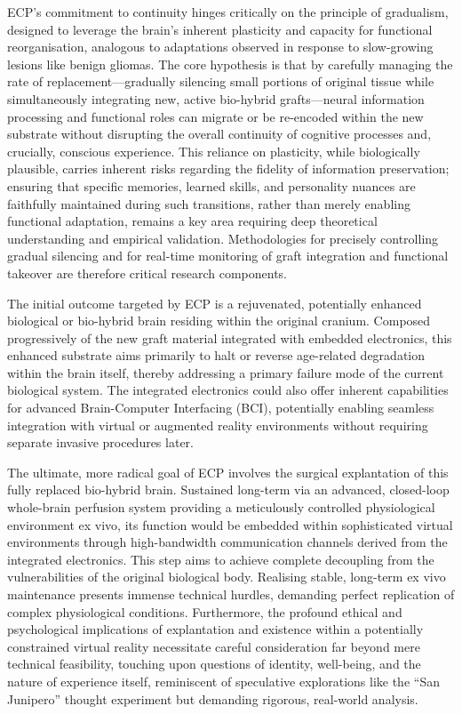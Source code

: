\documentclass[10pt]{article}
\begin{document}
\begin{sloppypar}
  ECP’s commitment to continuity hinges critically on the principle of gradualism, designed to leverage the brain’s inherent plasticity and capacity for functional reorganisation, analogous to adaptations observed in response to slow-growing lesions like benign gliomas. The core hypothesis is that by carefully managing the rate of replacement—gradually silencing small portions of original tissue while simultaneously integrating new, active bio-hybrid grafts—neural information processing and functional roles can migrate or be re-encoded within the new substrate without disrupting the overall continuity of cognitive processes and, crucially, conscious experience. This reliance on plasticity, while biologically plausible, carries inherent risks regarding the fidelity of information preservation; ensuring that specific memories, learned skills, and personality nuances are faithfully maintained during such transitions, rather than merely enabling functional adaptation, remains a key area requiring deep theoretical understanding and empirical validation. Methodologies for precisely controlling gradual silencing and for real-time monitoring of graft integration and functional takeover are therefore critical research components.

  The initial outcome targeted by ECP is a rejuvenated, potentially enhanced biological or bio-hybrid brain residing within the original cranium. Composed progressively of the new graft material integrated with embedded electronics, this enhanced substrate aims primarily to halt or reverse age-related degradation within the brain itself, thereby addressing a primary failure mode of the current biological system. The integrated electronics could also offer inherent capabilities for advanced Brain-Computer Interfacing (BCI), potentially enabling seamless integration with virtual or augmented reality environments without requiring separate invasive procedures later.

  The ultimate, more radical goal of ECP involves the surgical explantation of this fully replaced bio-hybrid brain. Sustained long-term via an advanced, closed-loop whole-brain perfusion system providing a meticulously controlled physiological environment ex vivo, its function would be embedded within sophisticated virtual environments through high-bandwidth communication channels derived from the integrated electronics. This step aims to achieve complete decoupling from the vulnerabilities of the original biological body. Realising stable, long-term ex vivo maintenance presents immense technical hurdles, demanding perfect replication of complex physiological conditions. Furthermore, the profound ethical and psychological implications of explantation and existence within a potentially constrained virtual reality necessitate careful consideration far beyond mere technical feasibility, touching upon questions of identity, well-being, and the nature of experience itself, reminiscent of speculative explorations like the “San Junipero” thought experiment but demanding rigorous, real-world analysis.


\end{sloppypar}
\end{document}
